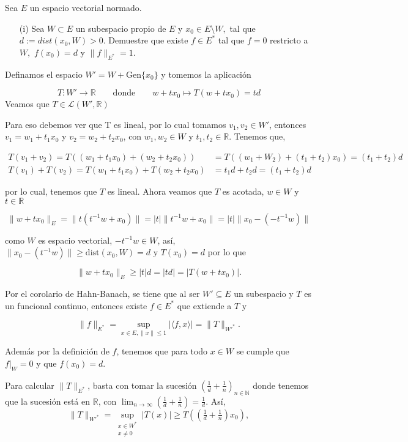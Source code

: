 Sea $E$ un espacio vectorial normado.
\begin{itemize}
    \item[(i)] Sea $W\subset E$ un subespacio propio de $E$ y $x_0\in E\setminus W,$ tal que $d:=dist(x_0,W)>0.$ Demuestre que existe $f\in E^*$ tal que $f=0$ restricto a $W,$ $f(x_0)=d$ y $\|f\|_{E^*}=1.$
\end{itemize} 

Definamos el espacio \(W' = W + \text{Gen}\{x_0\}\) y tomemos la aplicación

$$
T : W' \longrightarrow \mathbb{R}
\qquad\text{donde}\qquad
w + t x_0 \mapsto T(w + t x_0) = t d
$$
Veamos que \(T \in \mathcal{L}(W', \mathbb{R})\)

Para eso debemos ver que T es lineal, por lo cual tomamos \(v_1, v_2 \in W'\), entonces \(v_1 = w_1 + t_1 x_0\) y \(v_2 = w_2 + t_2 x_0\), con \(w_1, w_2 \in W\) y \(t_1, t_2 \in \mathbb{R}\). Tenemos que, 

\begin{align*}
T(v_1 + v_2) = T\left((w_1 + t_1 x_0) + (w_2 + t_2 x_0)\right)
&= T((w_1 + W_2) + (t_1 + t_2)x_0)
= (t_1 + t_2)d \\
T(v_1) + T(v_2) = T(w_1 + t_1 x_0) + T(w_2 + t_2 x_0) &= t_1 d + t_2 d = (t_1 + t_2)d
\end{align*}

por lo cual, tenemos que $T$ es lineal. Ahora veamos que $T$ es acotada,  \(w \in W\) y \(t \in \mathbb{R}\)

$$
\| w + t x_0 \|_E = \| t(t^{-1} w + x_0) \| = |t| \| t^{-1} w + x_0 \| = |t| \| x_0 - (-t^{-1} w) \|
$$

como \(W\) es espacio vectorial, \(-t^{-1}w \in W\), así, $
\| x_0 - (t^{-1} w) \| \geq \text{dist}(x_0, W) = d
\text{ y } T(x_0) = d$ por lo que



$$
\| w + t x_0 \|_E \geq |t| d = |t d| = |T(w + t x_0)|.
$$

Por el corolario de Hahn-Banach, se tiene que al ser \(W' \subseteq E\) un subespacio y \(T\) es un funcional continuo, entonces existe \(f \in E^*\) que extiende a \(T\) y

$$
\|f\|_{E^*} = \sup_{x \in E, \|x\| \leq 1} | \langle f, x \rangle | = \|T\|_{W'^*}.
$$

Además por la definición de $f$, tenemos que para todo $x\in W$ se cumple que $f|_W = 0$ y que $ f(x_0) =d$.
 
Para calcular \(\|T\|_{E^*}\), basta con tomar la sucesión $\left( \tfrac{1}{d} + \tfrac{1}{n} \right)_{n \in \mathbb{N}}$ donde tenemos que la sucesión está en $\mathbb{R}$, con \(\lim_{n \to \infty} \left( \tfrac{1}{d} + \tfrac{1}{n} \right) = \tfrac{1}{d}\). Así,
$$
\|T\|_{W'^*} = \sup_{\substack{x \in W^{*}\\ x \neq 0}} |T(x)| \geq T\left( \left( \tfrac{1}{d} + \tfrac{1}{n} \right) x_0 \right),
$$

